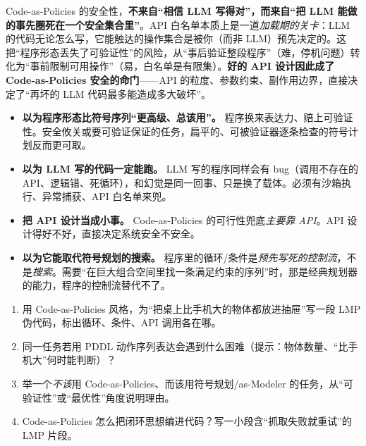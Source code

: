 \begin{insight}
Code-as-Policies 的安全性，\textbf{不来自“相信 LLM 写得对”，而来自“把 LLM 能做的事先圈死在一个安全集合里”}。API 白名单本质上是一道\emph{加载期的关卡}：LLM 的代码无论怎么写，它能触达的操作集合是被你（而非 LLM）预先决定的。这把“程序形态丢失了可验证性”的风险，从“事后验证整段程序”（难，停机问题）转化为“事前限制可用操作”（易，白名单是有限集）。\textbf{好的 API 设计因此成了 Code-as-Policies 安全的命门}——API 的粒度、参数约束、副作用边界，直接决定了“再坏的 LLM 代码最多能造成多大破坏”。
\end{insight}

\begin{pitfall}[本节常见陷阱]
\begin{itemize}
  \item \textbf{以为程序形态比符号序列“更高级、总该用”。} 程序换来表达力、赔上可验证性。安全攸关或要可验证保证的任务，扁平的、可被验证器逐条检查的符号计划反而更可取。
  \item \textbf{以为 LLM 写的代码一定能跑。} LLM 写的程序同样会有 bug（调用不存在的 API、逻辑错、死循环），和幻觉是同一回事、只是换了载体。必须有沙箱执行、异常捕获、API 白名单来兜。
  \item \textbf{把 API 设计当成小事。} Code-as-Policies 的可行性兜底\emph{主要靠 API}。API 设计得好不好，直接决定系统安全不安全。
  \item \textbf{以为它能取代符号规划的搜索。} 程序里的循环/条件是\emph{预先写死的控制流}，不是\emph{搜索}。需要“在巨大组合空间里找一条满足约束的序列”时，那是经典规划器的能力，程序的控制流替代不了。
\end{itemize}
\end{pitfall}

\begin{exercise}
\begin{enumerate}
  \item 用 Code-as-Policies 风格，为“把桌上比手机大的物体都放进抽屉”写一段 LMP 伪代码，标出循环、条件、API 调用各在哪。
  \item 同一任务若用 PDDL 动作序列表达会遇到什么困难（提示：物体数量、“比手机大”何时能判断）？
  \item 举一个\emph{不该}用 Code-as-Policies、而该用符号规划/as-Modeler 的任务，从“可验证性”或“最优性”角度说明理由。
  \item Code-as-Policies 怎么把闭环思想编进代码？写一小段含“抓取失败就重试”的 LMP 片段。
\end{enumerate}
\end{exercise}

